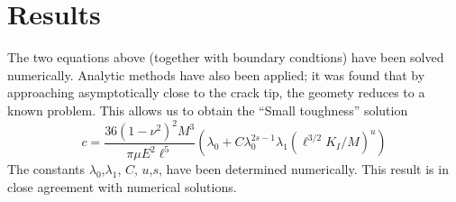 \documentclass{article}
\begin{document}
\section*{Results}
The two equations above (together with boundary condtions) have been solved
numerically. Analytic methods have also been applied; it was found that 
by approaching asymptotically close to the crack tip, the geomety reduces
to a known problem. This allows us to obtain the ``Small toughness'' 
solution
\[ c = \frac{36(1-\nu^2)^2M^3}{\pi \mu E^2 \ell^5}\left(\lambda_0 + C 
\lambda_0^{2s-1}\lambda_1 (\ell^{3/2}K_I/M)^u \right) \]
The constants $\lambda_0$,$\lambda_1$, $C$, $u$,$s$, have been determined 
numerically. This result is in close agreement with numerical solutions.
\end{document}
